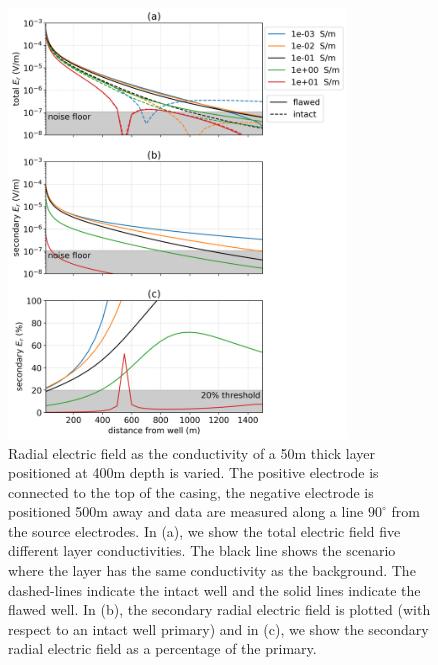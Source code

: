 \begin{figure}
    \begin{center}
    \includegraphics[width=0.8\textwidth]{figures/dc_casing/integrity_layer.png}
    \end{center}
\caption{
    Radial electric field as the conductivity of a 50m thick layer positioned at 400m depth is varied.
    The positive electrode is connected to the top of the casing, the negative electrode
    is positioned 500m away and data are measured along a line $90^\circ$ from the
    source electrodes. In (a), we show the total electric field five different layer conductivities.
    The black line shows the scenario where the layer has the same conductivity as the background.
    The dashed-lines indicate the intact well and the solid lines indicate the flawed well.
    In (b), the secondary radial electric field is plotted (with respect to an intact well primary)
    and in (c), we show the
    secondary radial electric field as a percentage of the primary.
}
\label{fig:integrity_layer}
\end{figure}

